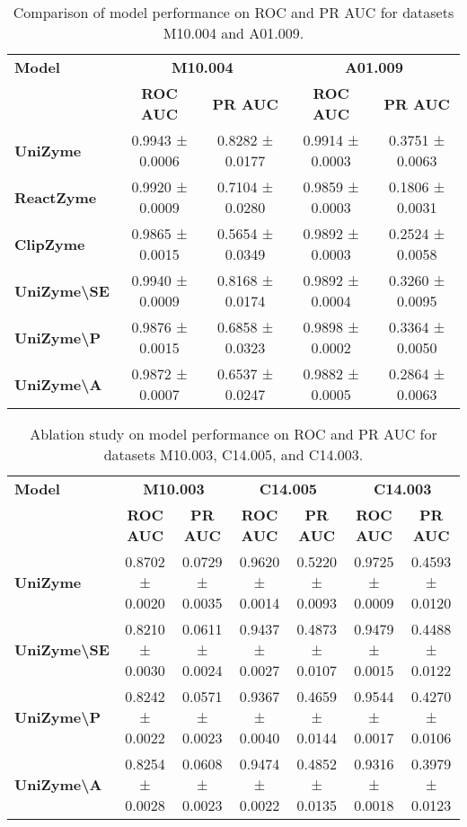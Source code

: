 \begin{table*}[ht]
\centering
\caption{Comparison of model performance on ROC and PR AUC for datasets M10.004 and A01.009.}
\label{tab:comparison_performance}
\begin{tabular}{lcccc}
\toprule
\textbf{Model} & \multicolumn{2}{c}{\textbf{M10.004}} & \multicolumn{2}{c}{\textbf{A01.009}} \\ 
\cmidrule(lr){2-3} \cmidrule(lr){4-5}
 & \textbf{ROC AUC} & \textbf{PR AUC} & \textbf{ROC AUC} & \textbf{PR AUC} \\ 
\midrule
\textbf{UniZyme}             & 0.9943 ± 0.0006 & 0.8282 ± 0.0177 & 0.9914 ± 0.0003 & 0.3751 ± 0.0063 \\ 
\textbf{ReactZyme}           & 0.9920 ± 0.0009 & 0.7104 ± 0.0280 & 0.9859 ± 0.0003 & 0.1806 ± 0.0031 \\ 
\textbf{ClipZyme}            & 0.9865 ± 0.0015 & 0.5654 ± 0.0349 & 0.9892 ± 0.0003 & 0.2524 ± 0.0058 \\ 
\textbf{UniZyme\textbackslash SE} & 0.9940 ± 0.0009 & 0.8168 ± 0.0174 & 0.9892 ± 0.0004 & 0.3260 ± 0.0095 \\ 
\textbf{UniZyme\textbackslash P}  & 0.9876 ± 0.0015 & 0.6858 ± 0.0323 & 0.9898 ± 0.0002 & 0.3364 ± 0.0050 \\ 
\textbf{UniZyme\textbackslash A}  & 0.9872 ± 0.0007 & 0.6537 ± 0.0247 & 0.9882 ± 0.0005 & 0.2864 ± 0.0063 \\ 
\bottomrule
\end{tabular}
\end{table*}




\begin{table*}[ht]
\centering
\small
\caption{Ablation study on model performance on ROC and PR AUC for datasets M10.003, C14.005, and C14.003.}
\label{tab:ablation_study}
\begin{tabular}{lcccccc}
\toprule
\textbf{Model} & \multicolumn{2}{c}{\textbf{M10.003}} & \multicolumn{2}{c}{\textbf{C14.005}} & \multicolumn{2}{c}{\textbf{C14.003}} \\ 
\cmidrule(lr){2-3} \cmidrule(lr){4-5} \cmidrule(lr){6-7}
 & \textbf{ROC AUC} & \textbf{PR AUC} & \textbf{ROC AUC} & \textbf{PR AUC} & \textbf{ROC AUC} & \textbf{PR AUC} \\ 
\midrule
\textbf{UniZyme}              & 0.8702 ± 0.0020 & 0.0729 ± 0.0035 & 0.9620 ± 0.0014 & 0.5220 ± 0.0093 & 0.9725 ± 0.0009 & 0.4593 ± 0.0120 \\ 
\textbf{UniZyme\textbackslash SE} & 0.8210 ± 0.0030 & 0.0611 ± 0.0024 & 0.9437 ± 0.0027 & 0.4873 ± 0.0107 & 0.9479 ± 0.0015 & 0.4488 ± 0.0122 \\ 
\textbf{UniZyme\textbackslash P}  & 0.8242 ± 0.0022 & 0.0571 ± 0.0023 & 0.9367 ± 0.0040 & 0.4659 ± 0.0144 & 0.9544 ± 0.0017 & 0.4270 ± 0.0106 \\ 
\textbf{UniZyme\textbackslash A}  & 0.8254 ± 0.0028 & 0.0608 ± 0.0023 & 0.9474 ± 0.0022 & 0.4852 ± 0.0135 & 0.9316 ± 0.0018 & 0.3979 ± 0.0123 \\ 
\bottomrule
\end{tabular}
\end{table*}








